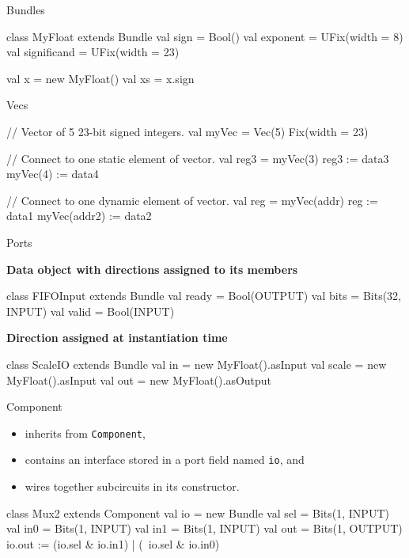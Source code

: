 \documentclass[xcolor=pdflatex,dvipsnames,table]{beamer}
\begin{document}
\begin{frame}[fragile]{Bundles}
\begin{scala}
class MyFloat extends Bundle {
  val sign        = Bool()
  val exponent    = UFix(width = 8)
  val significand = UFix(width = 23)
}

val x  = new MyFloat()
val xs = x.sign
\end{scala}
\end{frame}

\begin{frame}[fragile]{Vecs}
\begin{scala}
// Vector of 5 23-bit signed integers.
val myVec = Vec(5) { Fix(width = 23) } 

// Connect to one static element of vector.
val reg3  = myVec(3)                   
reg3     := data3 
myVec(4) := data4

// Connect to one dynamic element of vector.
val reg       = myVec(addr)
reg          := data1
myVec(addr2) := data2
\end{scala}
\end{frame}

\begin{frame}[fragile]{Ports}

\textbf{Data object with directions assigned to its members}

\begin{scala}
class FIFOInput extends Bundle {
  val ready = Bool(OUTPUT)
  val bits  = Bits(32, INPUT)
  val valid = Bool(INPUT)
}
\end{scala}

\textbf{Direction assigned at instantiation time}

\begin{scala}
class ScaleIO extends Bundle {
  val in    = new MyFloat().asInput
  val scale = new MyFloat().asInput
  val out   = new MyFloat().asOutput
}
\end{scala}
\end{frame}

\begin{frame}[fragile]{Component}

\begin{itemize}
\item inherits from \verb+Component+,
\item contains an interface stored in a port field named \verb+io+, and
\item wires together subcircuits in its constructor.
\end{itemize}

\begin{scala}
class Mux2 extends Component {
  val io = new Bundle{
    val sel = Bits(1, INPUT)
    val in0 = Bits(1, INPUT)
    val in1 = Bits(1, INPUT)
    val out = Bits(1, OUTPUT)
  }
  io.out := (io.sel & io.in1) | (~io.sel & io.in0)
}
\end{scala}

\end{frame}
\end{document}
